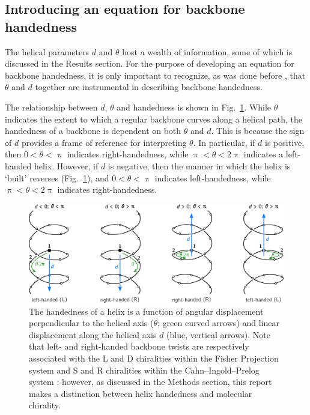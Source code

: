 \documentclass[fleqn,10pt,lineno]{wlpeerj} %
\newcommand{\n}[1]{{\color{blue}#1}}
\newcommand{\Fig}[1]{Fig.~\ref{#1}}
\begin{document}
\subsection*{\n{Introducing} an equation for backbone handedness} 
The helical parameters $d$ and $\theta$ host a wealth of information\n{, some of which is discussed in the Results section. For the purpose of developing an equation for backbone handedness, it is only important to recognize, as was done before \citep{Zacharias2013}, that $\theta$ and $d$ together are instrumental in describing  backbone handedness.} %

The relationship between $d$, $\theta$ and  handedness is shown in \Fig{fig:helix_handedness}. While $\theta$ indicates the extent to which a regular backbone \n{curves along a helical path}, the handedness of a backbone is dependent on both $\theta$ and $d$\n{. This is because} the sign of $d$ provides a frame of reference for interpreting $\theta$. In particular, if $d$ is positive, then \n{$0 < \theta < \uppi$} indicates right-handedness, while \n{$\uppi < \theta < 2\uppi$} indicates a left-handed helix. However, if $d$ is negative, then the manner in which the helix is `built' reverses (\Fig{fig:helix_handedness}), and \n{$0 < \theta < \uppi$} indicates left-handedness, while \n{$\uppi < \theta < 2\uppi$} indicates right-handedness.

\begin{figure}[t!]
\centering
\includegraphics[width=0.85\linewidth]{./figures/helix_handedness.pdf}
\caption{\label{fig:helix_handedness} The handedness of a helix is a function of angular displacement perpendicular to the helical axis ($\theta$; green curved arrows) and linear displacement along the helical axis $d$ (blue, vertical arrows). Note that left- and right-handed backbone twists are respectively associated with the L and D chiralities within the Fisher Projection system and S and R chiralities within the Cahn--Ingold--Prelog system \citep{Cross2013}; however, as discussed in the Methods section, this report makes a distinction between helix handedness and molecular chirality.
}
\end{figure}
\end{document}
